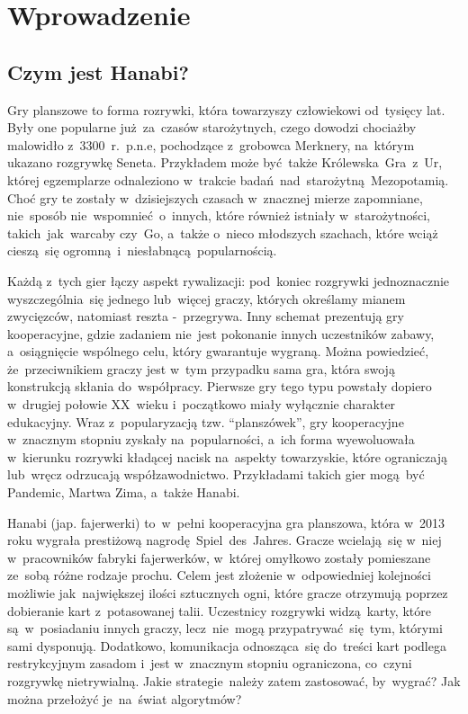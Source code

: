 \documentclass[declaration,shortabstract,inz]{iithesis}
\author{Wojciech Jarząbek\and Jacek Leja}
\date{\today}
\begin{document}
\chapter{Wprowadzenie}

\section{Czym jest Hanabi?}

Gry planszowe to forma rozrywki, która towarzyszy człowiekowi od~tysięcy lat. Były one popularne już za~czasów starożytnych, czego dowodzi chociażby malowidło z~3300~r.~p.n.e, pochodzące z~grobowca Merknery, na~którym ukazano rozgrywkę Seneta. Przykładem może być także Królewska~Gra~z~Ur, której egzemplarze odnaleziono w~trakcie badań nad~starożytną Mezopotamią. Choć gry te zostały w~dzisiejszych czasach w~znacznej mierze zapomniane, nie~sposób nie~wspomnieć o~innych, które również istniały w~starożytności, takich~jak~warcaby czy~Go, a~także o~nieco młodszych szachach, które wciąż cieszą~się ogromną i~niesłabnącą popularnością.

Każdą z~tych gier łączy aspekt rywalizacji: pod~koniec rozgrywki jednoznacznie wyszczególnia~się jednego lub~więcej graczy, których określamy mianem zwycięzców, natomiast reszta -~przegrywa. Inny schemat prezentują gry kooperacyjne, gdzie zadaniem nie~jest pokonanie innych uczestników zabawy, a~osiągnięcie wspólnego celu, który gwarantuje wygraną. Można powiedzieć, że~przeciwnikiem graczy jest w~tym przypadku sama gra, która swoją konstrukcją skłania do~współpracy. Pierwsze gry tego typu powstały dopiero w~drugiej połowie XX~wieku i~początkowo miały wyłącznie charakter edukacyjny. Wraz z~popularyzacją tzw. ``planszówek'', gry kooperacyjne w~znacznym stopniu zyskały na~popularności, a~ich forma wyewoluowała w~kierunku rozrywki kładącej nacisk na~aspekty towarzyskie, które ograniczają lub~wręcz odrzucają współzawodnictwo. Przykładami takich gier mogą~być Pandemic, Martwa Zima, a~także Hanabi.

Hanabi (jap. fajerwerki) to~w~pełni kooperacyjna gra planszowa, która w~2013 roku wygrała prestiżową nagrodę Spiel~des~Jahres. Gracze wcielają~się w~niej w~pracowników fabryki fajerwerków, w~której omyłkowo zostały pomieszane ze~sobą różne rodzaje prochu. Celem jest złożenie w~odpowiedniej kolejności możliwie jak~największej ilości sztucznych ogni, które gracze otrzymują poprzez dobieranie kart z~potasowanej talii. Uczestnicy rozgrywki widzą karty, które są~w~posiadaniu innych graczy, lecz~nie~mogą przypatrywać~się~tym, którymi sami dysponują. Dodatkowo, komunikacja odnosząca~się do~treści kart podlega restrykcyjnym zasadom i~jest w~znacznym stopniu ograniczona, co~czyni rozgrywkę nietrywialną. Jakie strategie należy zatem zastosować, by~wygrać? Jak można przełożyć je~na~świat algorytmów?
\end{document}
